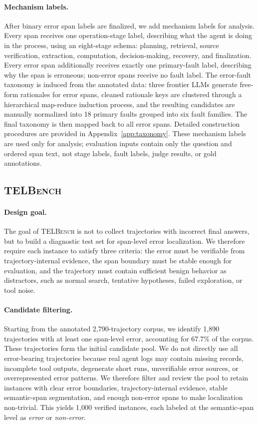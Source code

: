 \paragraph{Mechanism labels.}
After binary error span labels are finalized, we add mechanism labels for analysis. Every span receives one operation-stage label, describing what the agent is doing in the process, using an eight-stage schema: planning, retrieval, source verification, extraction, computation, decision-making, recovery, and finalization. Every error span additionally receives exactly one primary-fault label, describing why the span is erroneous; non-error spans receive no fault label. The error-fault taxonomy is induced from the annotated data: three frontier LLMs generate free-form rationales for error spans, cleaned rationale keys are clustered through a hierarchical map-reduce induction process, and the resulting candidates are manually normalized into 18 primary faults grouped into six fault families. The final taxonomy is then mapped back to all error spans. Detailed construction procedures are provided in Appendix~\ref{app:taxonomy}. These mechanism labels are used only for analysis; evaluation inputs contain only the question and ordered span text, not stage labels, fault labels, judge results, or gold annotations.

\subsection{\textsc{TELBench}}
\paragraph{Design goal.}
The goal of \textsc{TELBench} is not to collect trajectories with incorrect final answers, but to build a diagnostic test set for span-level error localization. We therefore require each instance to satisfy three criteria: the error must be verifiable from trajectory-internal evidence, the span boundary must be stable enough for evaluation, and the trajectory must contain sufficient benign behavior as distractors, such as normal search, tentative hypotheses, failed exploration, or tool noise.

\paragraph{Candidate filtering.}
Starting from the annotated 2,790-trajectory corpus, we identify 1,890 trajectories with at least one span-level error, accounting for 67.7\% of the corpus. These trajectories form the initial candidate pool. We do not directly use all error-bearing trajectories because real agent logs may contain missing records, incomplete tool outputs, degenerate short runs, unverifiable error sources, or overrepresented error patterns. We therefore filter and review the pool to retain instances with clear error boundaries, trajectory-internal evidence, stable semantic-span segmentation, and enough non-error spans to make localization non-trivial. This yields 1,000 verified instances, each labeled at the semantic-span level as \emph{error} or \emph{non-error}.

